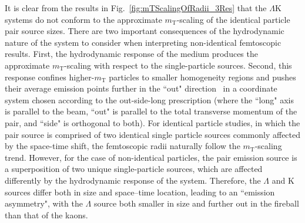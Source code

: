 \documentclass[ALICE,manyauthors]{cernphprep}
\newcommand{\mt}{$m_{\mathrm{T}}$\xspace}
\newcommand{\Lam}{$\Lambda$\xspace}
\newcommand{\LamK}{$\Lambda$K\xspace}
\begin{document}
It is clear from the results in Fig.~\ref{fig:mTScalingOfRadii_3Res} that the \LamK systems do not conform to the approximate \mt-scaling of the identical particle pair source sizes.
There are two important consequences of the hydrodynamic nature of the system to consider when interpreting non-identical femtoscopic results.
First, the hydrodynamic response of the medium produces the approximate \mt-scaling with respect to the single-particle sources.
Second, this response confines higher-\mt particles to smaller homogeneity regions and pushes their average emission points further in the ``out" direction~\cite{Retiere:2003kf} in a coordinate system chosen according to the out-side-long prescription (where the ``long" axis is parallel to the beam, ``out" is parallel to the total transverse momentum of the pair, and ``side" is orthogonal to both).
For identical particle studies, in which the pair source is comprised of two identical single particle sources commonly affected by the space-time shift, the femtoscopic radii naturally follow the \mt-scaling trend.
However, for the case of non-identical particles, the pair emission source is a superposition of two unique single-particle sources, which are affected differently by the hydrodynamic response of the system.
Therefore, the \Lam and K sources differ both in size and space--time location, leading to an ``emission asymmetry", with the \Lam source both smaller in size and further out in the fireball than that of the kaons.
\end{document}
